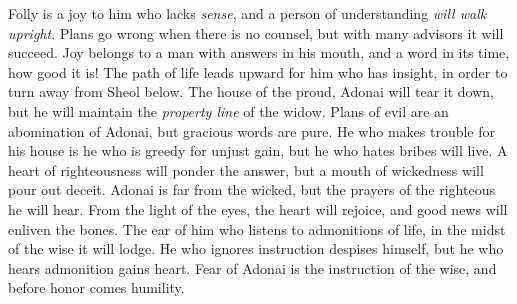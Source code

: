 \begin{biblechapter}
\verse Folly is a joy to him who lacks \textit{sense}, 
and a person of understanding \textit{will walk upright}.
\verse Plans go wrong when there is no counsel, 
but with many advisors it will succeed.
\verse Joy belongs to a man with answers in his mouth, 
and a word in its time, how good it is!
\verse The path of life leads upward for him who has insight, 
in order to turn away from Sheol below.
\verse The house of the proud, Adonai will tear it down, 
but he will maintain the \textit{property line} of the widow.
\verse Plans of evil are an abomination of Adonai, 
but gracious words are pure.
\verse He who makes trouble for his house is he who is greedy for unjust gain, 
but he who hates bribes will live.
\verse A heart of righteousness will ponder the answer, 
but a mouth of wickedness will pour out deceit.
\verse Adonai is far from the wicked, 
but the prayers of the righteous he will hear.
\verse From the light of the eyes, the heart will rejoice, 
and good news will enliven the bones.
\verse The ear of him who listens to admonitions of life, 
in the midst of the wise it will lodge.
\verse He who ignores instruction despises himself, 
but he who hears admonition gains heart.
\verse Fear of Adonai is the instruction of the wise, 
and before honor comes humility.
\end{biblechapter}

